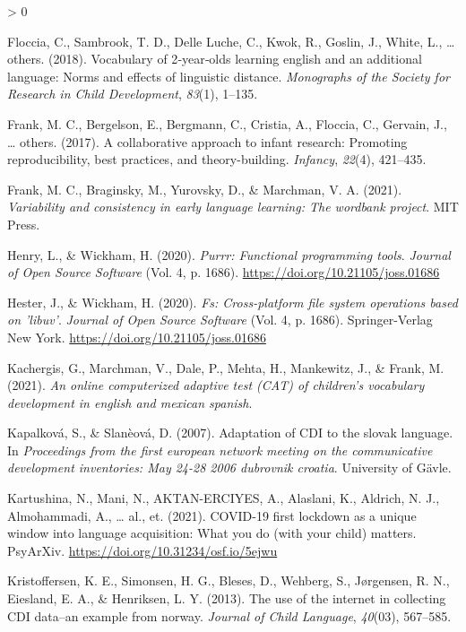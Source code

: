 \documentclass[
  english,
  ,man,floatsintext]{apa6}
\newlength{\cslhangindent}
\newenvironment{CSLReferences}[2] %
 {%
  \setlength{\parindent}{0pt}
  \ifodd #1 \everypar{\setlength{\hangindent}{\cslhangindent}}\ignorespaces\fi
  \ifnum #2 > 0
  \setlength{\parskip}{#2\baselineskip}
  \fi
 }%
 {}
\begin{document}
\begin{CSLReferences}{1}{0}
\leavevmode\hypertarget{ref-floccia2018}{}%
Floccia, C., Sambrook, T. D., Delle Luche, C., Kwok, R., Goslin, J., White, L., \ldots{} others. (2018). Vocabulary of 2‐year‐olds learning english and an additional language: Norms and effects of linguistic distance. \emph{Monographs of the Society for Research in Child Development}, \emph{83}(1), 1--135.

\leavevmode\hypertarget{ref-frank2017}{}%
Frank, M. C., Bergelson, E., Bergmann, C., Cristia, A., Floccia, C., Gervain, J., \ldots{} others. (2017). A collaborative approach to infant research: Promoting reproducibility, best practices, and theory-building. \emph{Infancy}, \emph{22}(4), 421--435.

\leavevmode\hypertarget{ref-Frank2021}{}%
Frank, M. C., Braginsky, M., Yurovsky, D., \& Marchman, V. A. (2021). \emph{Variability and consistency in early language learning: The wordbank project}. MIT Press.

\leavevmode\hypertarget{ref-R-purrr}{}%
Henry, L., \& Wickham, H. (2020). \emph{Purrr: Functional programming tools}. \emph{Journal of Open Source Software} (Vol. 4, p. 1686). \url{https://doi.org/10.21105/joss.01686}

\leavevmode\hypertarget{ref-R-fs}{}%
Hester, J., \& Wickham, H. (2020). \emph{Fs: Cross-platform file system operations based on 'libuv'}. \emph{Journal of Open Source Software} (Vol. 4, p. 1686). Springer-Verlag New York. \url{https://doi.org/10.21105/joss.01686}

\leavevmode\hypertarget{ref-Kachergis}{}%
Kachergis, G., Marchman, V., Dale, P., Mehta, H., Mankewitz, J., \& Frank, M. (2021). \emph{An online computerized adaptive test (CAT) of children's vocabulary development in english and mexican spanish}.

\leavevmode\hypertarget{ref-Kapalkova2007}{}%
Kapalková, S., \& Slanèová, D. (2007). Adaptation of CDI to the slovak language. In \emph{Proceedings from the first european network meeting on the communicative development inventories: May 24-28 2006 dubrovnik croatia}. University of Gävle.

\leavevmode\hypertarget{ref-Kartushina2021}{}%
Kartushina, N., Mani, N., AKTAN-ERCIYES, A., Alaslani, K., Aldrich, N. J., Almohammadi, A., \ldots{} al., et. (2021). COVID-19 first lockdown as a unique window into language acquisition: What you do (with your child) matters. PsyArXiv. \url{https://doi.org/10.31234/osf.io/5ejwu}

\leavevmode\hypertarget{ref-kristoffersen2013}{}%
Kristoffersen, K. E., Simonsen, H. G., Bleses, D., Wehberg, S., Jørgensen, R. N., Eiesland, E. A., \& Henriksen, L. Y. (2013). The use of the internet in collecting CDI data--an example from norway. \emph{Journal of Child Language}, \emph{40}(03), 567--585.


\end{CSLReferences}
\end{document}
